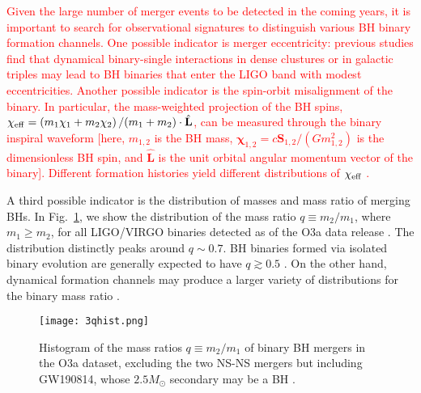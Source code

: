 \documentclass[
        fleqn,
        usenatbib,
    ]{mnras}
\newcommand*{\p}[1]{\left(#1\right)}
\newcommand*{\bm}[1]{\mathbf{#1}}
\newcommand*{\uv}[1]{\hat{\mathbf{#1}}}
\newlength{\colummwidth}
\begin{document}
\textcolor{red}{Given the large number of merger events to be detected in the
coming years, it is important to search for observational signatures to
distinguish various BH binary formation channels. One possible indicator is
merger eccentricity: previous studies find that dynamical binary-single
interactions in dense clustures \citep[e.g.,][]{samsing2017assembly,
rodriguez2018post, samsing2018black, fragione2019bromberg} or in galactic
triples \citep{silsbee2017lidov, antonini2017binary, fragione2019loeb} may lead
to BH binaries that enter the LIGO band with modest eccentricities. Another
possible indicator is the spin-orbit misalignment of the binary. In particular,
the mass-weighted projection of the BH spins, $\chi_{\rm eff} = \p{m_1
\bm{\chi}_1 + m_2\bm{\chi}_2} / (m_1 + m_2) \cdot \uv{L}$, can be measured
through the binary inspiral waveform [here, $m_{1,2}$ is the BH mass,
$\bm{\chi}_{1,2} = c\bm{S}_{1,2} / \p{Gm_{1,2}^2}$ is the dimensionless BH spin,
and $\uv{L}$ is the unit orbital angular momentum vector of the binary].
Different formation histories yield different distributions of $\chi_{\rm eff}$
\citep{LL17, LL18, LL19, antonini2018precessional, rodriguez2018post,
su2020spin}.}

A third possible indicator is the distribution of masses and mass ratio of
merging BHs. In Fig.~\ref{fig:qhist}, we show the distribution of the mass
ratio $q \equiv m_2 / m_1$, where $m_1 \geq m_2$, for all LIGO/VIRGO binaries
detected as of the O3a data release \citep{LIGOO3a}. The distribution distinctly
peaks around $q \sim 0.7$. BH binaries formed via isolated binary evolution are
generally expected to have $q \gtrsim 0.5$ \citep{belczynski2016first,
olejak2020}. On the other hand, dynamical formation channels may produce a
larger variety of distributions for the binary mass ratio
\citep[e.g.,][]{silsbee2017lidov, fragione2019}.

\begin{figure}
    \centering
    \texttt{[image: 3qhist.png]}
    \caption{Histogram of the mass ratios $q \equiv m_2 / m_1$ of binary BH
    mergers in the O3a dataset, excluding the two NS-NS mergers but including
    GW190814, whose $2.5M_{\odot}$ secondary may be a BH \citep{LIGOO3a}.
    }\label{fig:qhist}
\end{figure}
\end{document}
